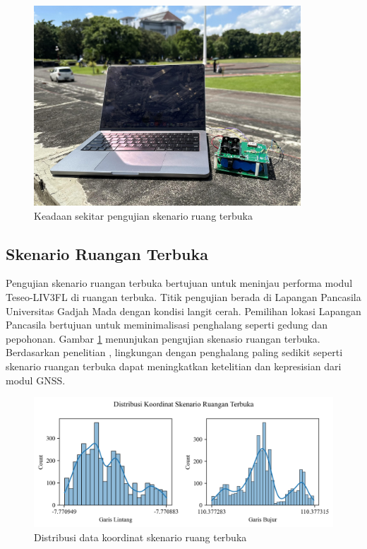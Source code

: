 \begin{figure}[H]
	\centering
	\includegraphics[width=10cm]{contents/chapter-4/4-skenario-outdoor/keadaan.jpg}
	\caption{Keadaan sekitar pengujian skenario ruang terbuka}
	\label{Fig: outdoor-keadaan}
\end{figure}

\subsection{Skenario Ruangan Terbuka}
Pengujian skenario ruangan terbuka bertujuan untuk meninjau performa modul Teseo\hyp{}LIV3FL di ruangan terbuka. Titik pengujian berada di Lapangan Pancasila Universitas Gadjah Mada dengan kondisi langit cerah. Pemilihan lokasi Lapangan Pancasila bertujuan untuk meminimalisasi penghalang seperti gedung dan pepohonan. Gambar \ref{Fig: outdoor-keadaan} menunjukan pengujian skenasio ruangan terbuka. Berdasarkan penelitian \cite{Lu2018}, lingkungan dengan penghalang paling sedikit seperti skenario ruangan terbuka dapat meningkatkan ketelitian dan kepresisian dari modul GNSS.

\begin{figure}[H]
	\centering
	\begin{adjustbox}{width=\textwidth}
		\includegraphics{contents/chapter-4/4-skenario-outdoor/distribution.png}
	\end{adjustbox}
	\caption{Distribusi data koordinat skenario ruang terbuka}
	\label{Fig:outdoor-distribution}
\end{figure}

